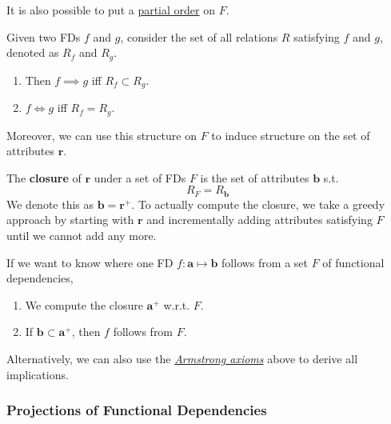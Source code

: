    It is also possible to put a \hyperref[st-def:partial-order]{partial order} on $F$. 

    \begin{definition}
      \label{def:partial-order}
      Given two FDs $f$ and $g$, consider the set of all relations $R$ satisfying $f$ and $g$, denoted as $R_f$ and $R_g$. 
      \begin{enumerate}
        \item Then $f \implies g$ iff $R_f \subset R_g$. 
        \item $f \iff g$ iff $R_f = R_g$. 
      \end{enumerate}
    \end{definition}

    Moreover, we can use this structure on $F$ to induce structure on the set of attributes $\mathbf{r}$. 

    \begin{definition}
      \label{def:closure-of-attributes}
      The \textbf{closure} of $\mathbf{r}$ under a set of FDs $F$ is the set of attributes $\mathbf{b}$ s.t. 
      \begin{equation}
        R_F = R_\mathbf{b}
      \end{equation}
      We denote this as $\mathbf{b} = \mathbf{r}^+$. To actually compute the closure, we take a greedy approach by starting with $\mathbf{r}$ and incrementally adding attributes satisfying $F$ until we cannot add any more. 
    \end{definition}

    \begin{theorem}
      \label{thm:implication-of-functional-dependencies}
      If we want to know where one FD $f: \mathbf{a} \mapsto \mathbf{b}$ follows from a set $F$ of functional dependencies, 
      \begin{enumerate}
        \item We compute the closure $\mathbf{a}^+$ w.r.t. $F$. 
        \item If $\mathbf{b} \subset \mathbf{a}^+$, then $f$ follows from $F$. 
      \end{enumerate}
      Alternatively, we can also use the \textit{\hyperref[thm:armstrong-axioms]{Armstrong axioms}} above to derive all implications. 
    \end{theorem}
  
  \subsubsection{Projections of Functional Dependencies} 

